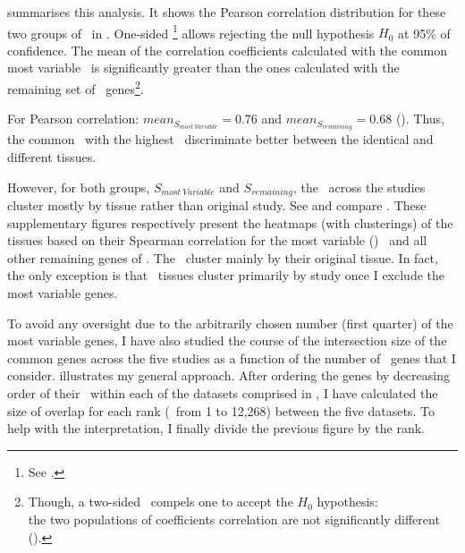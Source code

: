  summarises this analysis.
It shows the Pearson correlation distribution
for these two groups of \pcgs\ in \setOne.
One-sided \Welchttest\footnote{See .}
allows rejecting the null hypothesis $H_0$ at 95\% of confidence.
The mean of the %
correlation coefficients
calculated with the common most variable \pcgs\ is significantly greater than
the ones calculated with the remaining set of \setOne\ genes\footnote{Though,
a two-sided \Welchttest\ compels one to accept the $H_0$ hypothesis:\\
the two populations of coefficients correlation are not significantly different
().}.

For Pearson correlation:
$mean_{S_{most~Variable}}=0.76$ and $mean_{S_{remaining}}=0.68$
().
Thus, the common \pcgs\ with the highest \cv\
discriminate better between the identical and different tissues.

However, for both groups,
$S_{most~Variable}$ and $S_{remaining}$,
the \treps\ across the studies cluster mostly by tissue rather than
original study.
See and compare .
These supplementary figures respectively present
the heatmaps (with clusterings) of the tissues
based on their Spearman correlation for the most variable (\cv) \pcgs\
and all other remaining genes of \setOne.
The \treps\ cluster mainly by their original tissue.
In fact, the only exception is that
\castle\ tissues cluster primarily by study
once I exclude the most variable genes.

To avoid any oversight due to the arbitrarily chosen number (first quarter)
of the most variable genes,
I have also studied the course of the intersection size of the common genes
across the five studies
as a function of the number of \setOne\ genes that I consider.
 illustrates my general approach.
After ordering the genes by decreasing order of their \cv\
within each of the datasets comprised in \setOne,
I have calculated the size of overlap for each rank (\ie\ from 1 to 12,268)
between the five datasets.
To help with the interpretation,
I finally divide the previous figure by the rank.

